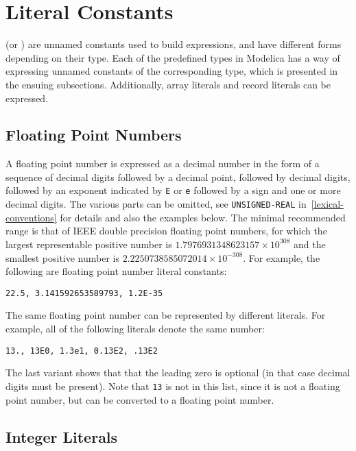 \section{Literal Constants}\label{literal-constants}

 (or ) are unnamed constants used to build expressions, and have different forms depending on their type.
Each of the predefined types in Modelica has a way of expressing unnamed constants of the corresponding type, which is presented in the ensuing subsections.
Additionally, array literals and record literals can be expressed.

\subsection{Floating Point Numbers}\label{floating-point-numbers}

A floating point number is expressed as a decimal number in the form of a sequence of decimal digits followed by a decimal point, followed by decimal digits, followed by an exponent indicated by \lstinline!E! or \lstinline!e! followed by a sign and one or more decimal digits.
The various parts can be omitted, see \lstinline[language=grammar]!UNSIGNED-REAL! in~\cref{lexical-conventions} for details and also the examples below.
The minimal recommended range is that of IEEE double precision floating point numbers, for which the largest representable positive number is $1.7976931348623157\times10^{308}$ and the smallest positive number is $2.2250738585072014\times 10^{-308}$.
For example, the following are floating point number literal constants:
\begin{lstlisting}[language=modelica]
22.5, 3.141592653589793, 1.2E-35
\end{lstlisting}

The same floating point number can be represented by different literals.
For example, all of the following literals denote the same number:
\begin{lstlisting}[language=modelica]
13., 13E0, 1.3e1, 0.13E2, .13E2
\end{lstlisting}
The last variant shows that that the leading zero is optional (in that case decimal digits must be present).
Note that \lstinline!13! is not in this list, since it is not a floating point number,
but can be converted to a floating point number.

\subsection{Integer Literals}\label{integer-literals}

